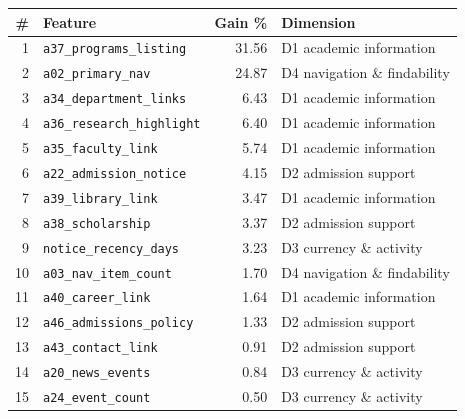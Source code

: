 \begin{tabular}{rlrl}
\toprule
\# & \textbf{Feature} & \textbf{Gain \%} & \textbf{Dimension} \\
\midrule
1 & \texttt{a37\_programs\_listing} & 31.56 & D1 academic information \\
2 & \texttt{a02\_primary\_nav} & 24.87 & D4 navigation \& findability \\
3 & \texttt{a34\_department\_links} & 6.43 & D1 academic information \\
4 & \texttt{a36\_research\_highlight} & 6.40 & D1 academic information \\
5 & \texttt{a35\_faculty\_link} & 5.74 & D1 academic information \\
6 & \texttt{a22\_admission\_notice} & 4.15 & D2 admission support \\
7 & \texttt{a39\_library\_link} & 3.47 & D1 academic information \\
8 & \texttt{a38\_scholarship} & 3.37 & D2 admission support \\
9 & \texttt{notice\_recency\_days} & 3.23 & D3 currency \& activity \\
10 & \texttt{a03\_nav\_item\_count} & 1.70 & D4 navigation \& findability \\
11 & \texttt{a40\_career\_link} & 1.64 & D1 academic information \\
12 & \texttt{a46\_admissions\_policy} & 1.33 & D2 admission support \\
13 & \texttt{a43\_contact\_link} & 0.91 & D2 admission support \\
14 & \texttt{a20\_news\_events} & 0.84 & D3 currency \& activity \\
15 & \texttt{a24\_event\_count} & 0.50 & D3 currency \& activity \\
\bottomrule
\end{tabular}
